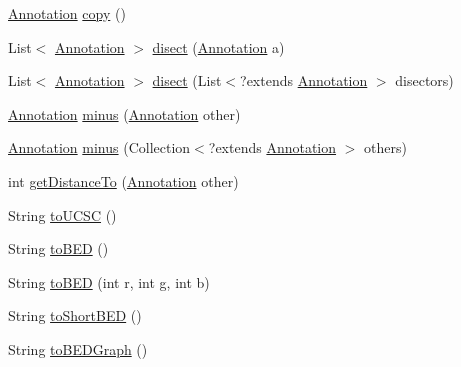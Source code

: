 \begin{DoxyCompactItemize}
\item 
\hyperlink{interfaceumms_1_1core_1_1annotation_1_1_annotation}{Annotation} \hyperlink{interfaceumms_1_1core_1_1annotation_1_1_annotation_a88efc6a83878d7af34c4a20786df29eb}{copy} ()
\item 
List$<$ \hyperlink{interfaceumms_1_1core_1_1annotation_1_1_annotation}{Annotation} $>$ \hyperlink{interfaceumms_1_1core_1_1annotation_1_1_annotation_a2d8472bb1b89213dd4c77b2206287638}{disect} (\hyperlink{interfaceumms_1_1core_1_1annotation_1_1_annotation}{Annotation} a)
\item 
List$<$ \hyperlink{interfaceumms_1_1core_1_1annotation_1_1_annotation}{Annotation} $>$ \hyperlink{interfaceumms_1_1core_1_1annotation_1_1_annotation_a294f182c91c0050e0564de42133317c1}{disect} (List$<$?extends \hyperlink{interfaceumms_1_1core_1_1annotation_1_1_annotation}{Annotation} $>$ disectors)
\item 
\hyperlink{interfaceumms_1_1core_1_1annotation_1_1_annotation}{Annotation} \hyperlink{interfaceumms_1_1core_1_1annotation_1_1_annotation_a29b9933703e5f5cd6c57b28499a20c87}{minus} (\hyperlink{interfaceumms_1_1core_1_1annotation_1_1_annotation}{Annotation} other)
\item 
\hyperlink{interfaceumms_1_1core_1_1annotation_1_1_annotation}{Annotation} \hyperlink{interfaceumms_1_1core_1_1annotation_1_1_annotation_a3b98ec0dfc3dc2c0a78c9a7296e8a733}{minus} (Collection$<$?extends \hyperlink{interfaceumms_1_1core_1_1annotation_1_1_annotation}{Annotation} $>$ others)
\item 
int \hyperlink{interfaceumms_1_1core_1_1annotation_1_1_annotation_a24f9c0d8338789f72d5a8be63affd084}{get\+Distance\+To} (\hyperlink{interfaceumms_1_1core_1_1annotation_1_1_annotation}{Annotation} other)
\item 
String \hyperlink{interfaceumms_1_1core_1_1annotation_1_1_annotation_a6be4427ca02f0d1f6cfeb9481ba09e0f}{to\+U\+C\+S\+C} ()
\item 
String \hyperlink{interfaceumms_1_1core_1_1annotation_1_1_annotation_a9ba56d942136f2409cae3984782a62e5}{to\+B\+E\+D} ()
\item 
String \hyperlink{interfaceumms_1_1core_1_1annotation_1_1_annotation_a4024797788b289bd246d4a4caa743690}{to\+B\+E\+D} (int r, int g, int b)
\item 
String \hyperlink{interfaceumms_1_1core_1_1annotation_1_1_annotation_a3f725a916b8a5b1b90f060eaead8e12a}{to\+Short\+B\+E\+D} ()
\item 
String \hyperlink{interfaceumms_1_1core_1_1annotation_1_1_annotation_a2e4110ffa3f2cda020be360f08c79f4b}{to\+B\+E\+D\+Graph} ()

\end{DoxyCompactItemize}
